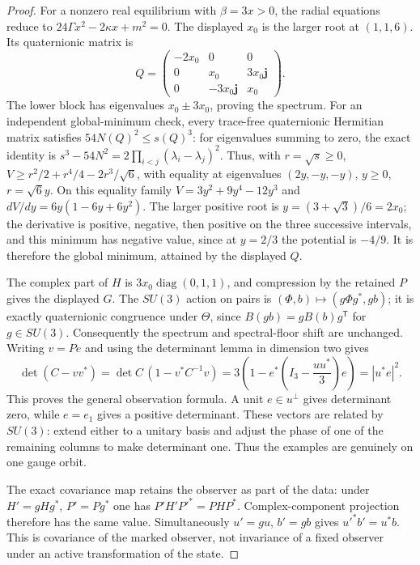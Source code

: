 \begin{proof}
For a nonzero real equilibrium with $\beta=3x>0$, the radial equations
reduce to
$24\Gamma x^2-2\kappa x+m^2=0$.
The displayed $x_0$ is the larger root at $(1,1,6)$.
Its quaternionic matrix is
\[
 Q=\begin{pmatrix}-2x_0&0&0\\0&x_0&3x_0\mathbf j\\
                       0&-3x_0\mathbf j&x_0\end{pmatrix}.
\]
The lower block has eigenvalues $x_0\pm3x_0$, proving the spectrum.
For an independent global-minimum check, every trace-free quaternionic
Hermitian matrix satisfies $54N(Q)^2\le s(Q)^3$: for eigenvalues summing
to zero, the exact identity is
$s^3-54N^2=2\prod_{i<j}(\lambda_i-\lambda_j)^2$.
Thus, with $r=\sqrt{s}\ge0$,
$V\ge r^2/2+r^4/4-2r^3/\sqrt6$, with equality at eigenvalues
$(2y,-y,-y)$, $y\ge0$, $r=\sqrt6y$.
On this equality family
$V=3y^2+9y^4-12y^3$ and
$dV/dy=6y(1-6y+6y^2)$.
The larger positive root is
$y=(3+\sqrt3)/6=2x_0$; the derivative is positive, negative,
then positive on the three successive intervals, and this minimum has
negative value, since at $y=2/3$ the potential is $-4/9$.
It is therefore the global minimum, attained by the displayed $Q$.

The complex part of $H$ is
$3x_0\operatorname{diag}(0,1,1)$, and compression by the retained $P$
gives the displayed $G$. The $SU(3)$ action on pairs is
$(\Phi,b)\mapsto(g\Phi g^*,gb)$; it is exactly quaternionic congruence
under $\Theta$, since $B(gb)=gB(b)g^{\mathsf T}$ for $g\in SU(3)$.
Consequently the spectrum and spectral-floor shift are unchanged.
Writing $v=Pe$ and using the determinant lemma in dimension two gives
\[
 \det(C-vv^*)=\det C\,(1-v^*C^{-1}v)
 =3\left(1-e^*\left(I_3-\frac{uu^*}{3}\right)e\right)
 =|u^*e|^2.
\]
This proves the general observation formula. A unit $e\in u^\perp$
gives determinant zero, while $e=e_1$ gives a positive determinant.
These vectors are related by $SU(3)$: extend either to a unitary basis
and adjust the phase of one of the remaining columns to make determinant
one. Thus the examples are genuinely on one gauge orbit.

The exact covariance map retains the observer as part of the data:
under $H'=gHg^*$, $P'=Pg^*$ one has
$P'H'P'^*=PHP^*$. Complex-component projection therefore has the same
value. Simultaneously $u'=gu$, $b'=gb$ gives $u'^*b'=u^*b$.
This is covariance of the marked observer, not invariance of a
fixed observer under an active transformation of the state.
\end{proof}


